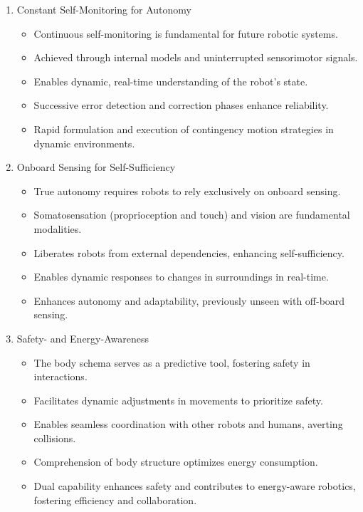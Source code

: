 \documentclass[12pt, a4paper]{article}
\begin{document}
\begin{enumerate}
\begin{itemize}
	\end{itemize}
	\item Constant Self-Monitoring for Autonomy
	\begin{itemize}
		\item Continuous self-monitoring is fundamental for future robotic systems.
		\item Achieved through internal models and uninterrupted sensorimotor signals.
		\item Enables dynamic, real-time understanding of the robot's state.
		\item Successive error detection and correction phases enhance reliability.
		\item Rapid formulation and execution of contingency motion strategies in dynamic environments.
	\end{itemize}
	\item Onboard Sensing for Self-Sufficiency 
	\begin{itemize}
		\item True autonomy requires robots to rely exclusively on onboard sensing.
		\item Somatosensation (proprioception and touch) and vision are fundamental modalities.
		\item Liberates robots from external dependencies, enhancing self-sufficiency.
		\item Enables dynamic responses to changes in surroundings in real-time.
		\item Enhances autonomy and adaptability, previously unseen with off-board sensing.
	\end{itemize}
	\item Safety- and Energy-Awareness
	\begin{itemize}
		\item The body schema serves as a predictive tool, fostering safety in interactions.
		\item Facilitates dynamic adjustments in movements to prioritize safety.
		\item Enables seamless coordination with other robots and humans, averting collisions.
		\item Comprehension of body structure optimizes energy consumption.
		\item Dual capability enhances safety and contributes to energy-aware robotics, fostering efficiency and collaboration.
	\end{itemize}
\end{enumerate}
\end{document}
